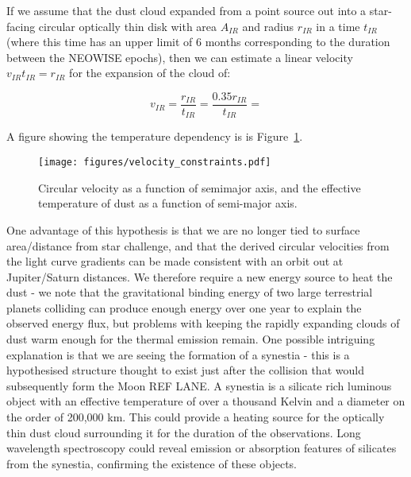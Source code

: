 \documentclass{aa}
\begin{document}
If we assume that the dust cloud expanded from a point source out into a star-facing circular optically thin disk with area $A_{IR}$ and radius $r_{IR}$ in a time $t_{IR}$ (where this time has an upper limit of 6 months corresponding to the duration between the NEOWISE epochs), then we can estimate a linear velocity $v_{IR} t_{IR} = r_{IR}$ for the expansion of the cloud of:

$$v_{IR} = \frac{r_{IR}}{t_{IR}} = \frac{0.35 r_{IR}}{t_{IR}} = $$

A figure showing the temperature dependency is is Figure~\ref{fig:veloc_cons}.

\begin{figure}
    \begin{centering}
    \texttt{[image: figures/velocity\_constraints.pdf]}
    \caption{Circular velocity as a function of semimajor axis, and the effective temperature of dust as a function of semi-major axis.
              }
    \label{fig:veloc_cons}
    \end{centering}
\end{figure}


One advantage of this hypothesis is that we are no longer tied to surface area/distance from star challenge, and that the derived circular velocities from the light curve gradients can be made consistent with an orbit out at Jupiter/Saturn distances.
%
We therefore require a new energy source to heat the dust - we note that the gravitational binding energy of two large terrestrial planets colliding can produce enough energy over one year to explain the observed energy flux, but problems with keeping the rapidly expanding clouds of dust warm enough for the thermal emission remain.
%
One possible intriguing explanation is that we are seeing the formation of a synestia - this is a hypothesised structure thought to exist just after the collision that would subsequently form the Moon REF LANE.
%
A synestia is a silicate rich luminous object with an effective temperature of over a thousand Kelvin and a diameter on the order of 200,000 km.
%
This could provide a heating source for the optically thin dust cloud surrounding it for the duration of the observations.
%
Long wavelength spectroscopy could reveal emission or absorption features of silicates from the synestia, confirming the existence of these objects.
\end{document}
